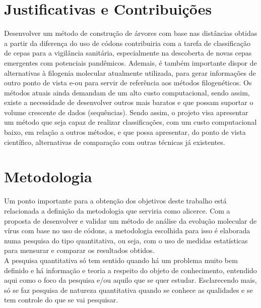 \documentclass[font=plain]{abnt}
\begin{document}
\chapter{Justificativas e Contribuições}

Desenvolver um método de construção de árvores com base nas distâncias obtidas a partir da diferença do uso de códons contribuiria com a tarefa de classificação de cepas para a vigilância sanitária, especialmente na descoberta de novas cepas emergentes com potenciais pandêmicos. Ademais, é também importante dispor de alternativas à filogenia molecular atualmente utilizada, para gerar informações de outro ponto de vista e-ou para servir de referência aos métodos filogenéticos.
Os métodos atuais ainda demandam de um alto custo computacional, sendo assim, existe a necessidade de desenvolver outros mais baratos e que possam suportar o volume crescente de dados (sequências).
Sendo assim, o projeto visa apresentar um método que seja capaz de realizar classificações, com um custo computacional baixo, em relação a outros métodos, e que possa apresentar, do ponto de vista científico, alternativas de comparação com outras técnicas já existentes.


\chapter{Metodologia}
Um ponto importante para a obtenção dos objetivos deste trabalho está relacionada a definição da metodologia que serviria como alicerce. Com a proposta de desenvolver e validar um método de análise da evolução molecular de vírus com base no uso de códons, a metodologia escolhida para isso é elaborada numa pesquisa do tipo quantitativa, ou seja, com o uso de medidas estatísticas para mensurar e comparar os resultados obtidos.\\
A pesquisa quantitativa só tem sentido quando há um problema muito bem definido e há informação e teoria a respeito do objeto de conhecimento, entendido aqui como o foco da pesquisa e/ou aquilo que se quer estudar. Esclarecendo mais, só se faz pesquisa de natureza quantitativa quando se conhece as qualidades e se tem controle do que se vai pesquisar.\cite{da_silva_pesquisa_2014}
\end{document}
